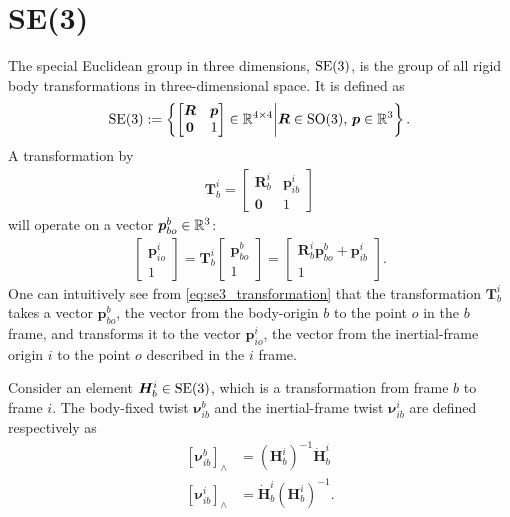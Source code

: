 \section{SE(3)}
\label{sec:bp:se3}

The special Euclidean group in three dimensions, $\operatorname{SE}(3)$, is the group of all
rigid body transformations in three-dimensional space. It is defined as
\begin{align}
    \operatorname{SE}(3) := \left\{ \begin{bmatrix}
        \bm{R} & \bm{p} \\
        \bm{0} & 1
    \end{bmatrix}
        \in \mathbb{R}^{4 \times 4} \middle| \bm{R} \in \operatorname{SO}(3), \, \bm{p} \in \mathbb{R}^3
    \right\}.
\end{align}
A transformation by 
\begin{align}
    \bm{T}_b^i = \begin{bmatrix}
        \bm{R}_{b}^i & \bm{p}_{ib}^i \\
        \bm{0} & 1
    \end{bmatrix}
\end{align}
will operate on a vector $\bm{p}_{bo}^b \in \mathbb{R}^3$:
\begin{align}
    \begin{bmatrix}
        \bm{p}_{io}^i  \\
        1
    \end{bmatrix}
    =
    \bm{T}_b^i \begin{bmatrix}
        \bm{p}_{bo}^b \\
        1
    \end{bmatrix}
    =
    \begin{bmatrix}
        \bm{R}_{b}^i \bm{p}_{bo}^b + \bm{p}_{ib}^i \\
        1
    \end{bmatrix}.
    \label{eq:se3_transformation}
\end{align}
One can intuitively see from \autoref{eq:se3_transformation} that the transformation
$\bm{T}_b^i$
takes a vector $\bm{p}_{bo}^b$, the vector from the body-origin $b$ to the point $o$
in the $b$ frame, and transforms it to the vector $\bm{p}_{io}^i$, the vector from
the inertial-frame origin $i$ to the point $o$ described in the $i$ frame.


Consider an element $\bm{H}_{b}^i \in \operatorname{SE}(3)$, which is a transformation from frame
$b$ to frame $i$. The body-fixed twist $\bm{\nu}_{ib}^b$ and the inertial-frame
twist $\bm{\nu}_{ib}^i$ are defined respectively as
\begin{subequations}
\begin{align}
    [\bm{\nu}_{ib}^b]_{\wedge} &= \left(\bm{H}_{b}^i\right)^{-1}\dot{\bm{H}}_{b}^i \label{eq:body_twist_def}\\
    [\bm{\nu}_{ib}^i]_{\wedge} &= \dot{\bm{H}}_{b}^i \left(\bm{H}_{b}^i\right)^{-1}. 
\end{align}
\end{subequations}

